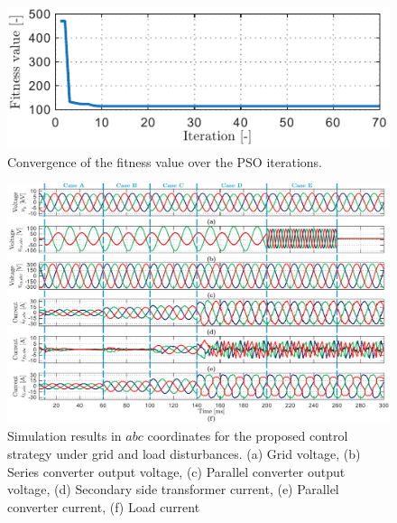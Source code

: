 \begin{figure}[t!]
    \centering
    \includegraphics[]{Images/Fitness_iterations.pdf}
    \caption{Convergence of the fitness value over the PSO iterations.}
    \label{fig:PSO_Fitness}
\end{figure}

\begin{figure}[t!]
    \centering
    \includegraphics[width=\textwidth]{Images/Simulation_Results.pdf}
    \caption{Simulation results in $abc$ coordinates for the proposed control strategy under grid and load disturbances. (a) Grid voltage, (b) Series converter output voltage, (c) Parallel converter output voltage, (d) Secondary side transformer current, (e) Parallel converter current, (f) Load current}
    \label{fig:Sim_results}
\end{figure}